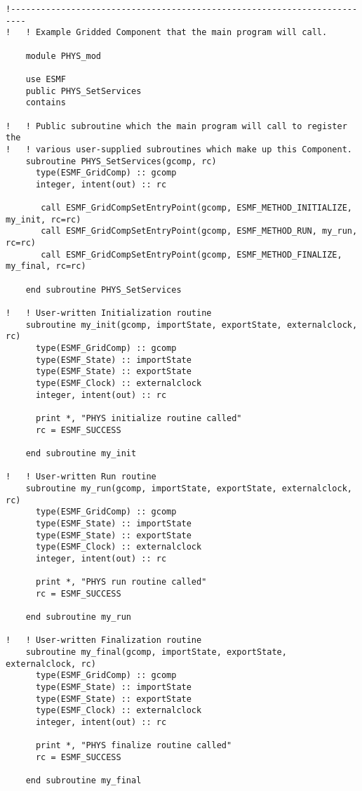  \begin{verbatim}
!-------------------------------------------------------------------------
!   ! Example Gridded Component that the main program will call.

    module PHYS_mod

    use ESMF
    public PHYS_SetServices
    contains

!   ! Public subroutine which the main program will call to register the
!   ! various user-supplied subroutines which make up this Component.
    subroutine PHYS_SetServices(gcomp, rc)
      type(ESMF_GridComp) :: gcomp
      integer, intent(out) :: rc

       call ESMF_GridCompSetEntryPoint(gcomp, ESMF_METHOD_INITIALIZE, my_init, rc=rc)
       call ESMF_GridCompSetEntryPoint(gcomp, ESMF_METHOD_RUN, my_run, rc=rc)
       call ESMF_GridCompSetEntryPoint(gcomp, ESMF_METHOD_FINALIZE, my_final, rc=rc)
      
    end subroutine PHYS_SetServices
      
!   ! User-written Initialization routine
    subroutine my_init(gcomp, importState, exportState, externalclock, rc)
      type(ESMF_GridComp) :: gcomp
      type(ESMF_State) :: importState
      type(ESMF_State) :: exportState
      type(ESMF_Clock) :: externalclock
      integer, intent(out) :: rc

      print *, "PHYS initialize routine called"
      rc = ESMF_SUCCESS

    end subroutine my_init

!   ! User-written Run routine
    subroutine my_run(gcomp, importState, exportState, externalclock, rc)
      type(ESMF_GridComp) :: gcomp
      type(ESMF_State) :: importState
      type(ESMF_State) :: exportState
      type(ESMF_Clock) :: externalclock
      integer, intent(out) :: rc

      print *, "PHYS run routine called"
      rc = ESMF_SUCCESS

    end subroutine my_run

!   ! User-written Finalization routine
    subroutine my_final(gcomp, importState, exportState, externalclock, rc)
      type(ESMF_GridComp) :: gcomp
      type(ESMF_State) :: importState
      type(ESMF_State) :: exportState
      type(ESMF_Clock) :: externalclock
      integer, intent(out) :: rc

      print *, "PHYS finalize routine called"
      rc = ESMF_SUCCESS

    end subroutine my_final


\end{verbatim}
